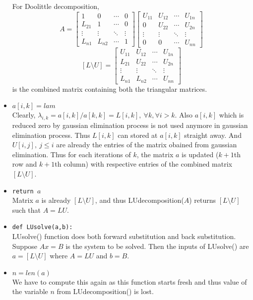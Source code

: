 \begin{remark}
\begin{commentary}
\begin{itemize}
	For Doolittle decomposition,
	\[ A = \begin{bmatrix} 1 & 0 & \cdots & 0 \\ L_{21} & 1 & \cdots & 0 \\ \vdots & \vdots & \ddots & \vdots \\ L_{n1} & L_{n2} & \cdots & 1 \end{bmatrix} \begin{bmatrix} U_{11} & U_{12} & \cdots & U_{1n} \\ 0 & U_{22} & \cdots & U_{2n} \\ \vdots & \vdots & \ddots & \vdots \\ 0 & 0 & \cdots & U_{nn} \end{bmatrix} \]
	\[ [L\text{\textbackslash{}}U] = \begin{bmatrix} U_{11} & U_{12} & \cdots & U_{1n} \\ L_{21} & U_{22} & \cdots & U_{2n} \\ \vdots & \vdots & \ddots & \vdots \\  L_{n1} & L_{n2} & \cdots & U_{nn} \end{bmatrix} \]
	is the combined matrix containing both the triangular matrices.
	\item \texttt{$a[i,k]=lam$} \\ Clearly, $\lambda_{i,k} = a[i,k]/a[k,k] = L[i,k],\ \forall k, \forall i>k$. Also $a[i,k]$ which is reduced zero by gaussian elimination process is not used anymore in gaussian elimination process. Thus $L[i,k]$ can stored at $a[i,k]$ straight away. And $U[i,j],\ j\le i$ are already the entries of the matrix obained from gaussian elimination. Thus for each iterations of $k$, the matrix $a$ is updated ($k+1$th row and $k+1$th column) with respective entries of the combined matrix $[L\text{\textbackslash{}}U]$.
	\item \texttt{return $a$} \\ Matrix $a$ is already $[L\text{\textbackslash{}}U]$, and thus LUdecomposition($A$) returns $[L\text{\textbackslash{}}U]$ such that $A = LU$.
	\item \texttt{def LUsolve(a,b):} \\ LUsolve() function does both forward substitution and back substitution. Suppose $Ax = B$ is the system to be solved. Then the inputs of LUsolve() are $ a = [L\text{\textbackslash{}}U]$ where $A = LU$ and $b = B$.
	\item \texttt{$n = len(a)$} \\ We have to compute this again as this function starts fresh and thus value of the variable $n$ from LUdecomposition() is lost.

\end{itemize}
\end{commentary}
\end{remark}
